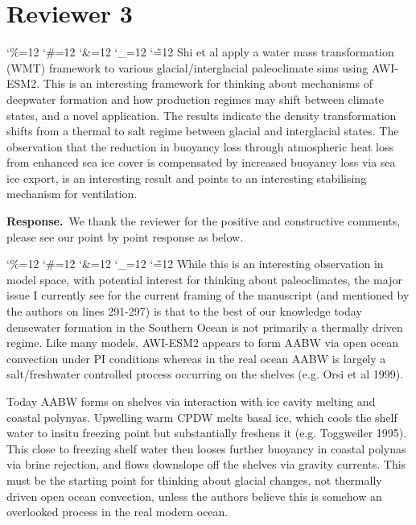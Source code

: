 \documentclass[11pt,a4paper]{article}
\newcommand{\reviewer}[1]{\section*{#1}}
\newcommand{\comment}[1]{\par\medskip\noindent\color{black}\begingroup\catcode`\%=12 \catcode`\#=12 \catcode`\&=12 \catcode`\_=12 \catcode`\~=12 \commentbody}
\newcommand{\commentbody}[1]{#1\endgroup\par\smallskip}
\newcommand{\response}{\par\noindent\color{chgcol}\textbf{Response.}\ }
\begin{document}


\reviewer{Reviewer 3}

\comment{R3}{Shi et al apply a water mass transformation (WMT) framework to various glacial/interglacial paleoclimate sims using AWI-ESM2. This is an interesting framework for thinking about mechanisms of deepwater formation and how production regimes may shift between climate states, and a novel application. The results indicate the density transformation shifts from a thermal to salt regime between glacial and interglacial states. The observation that the reduction in buoyancy loss through atmospheric heat loss from enhanced sea ice cover is compensated by increased buoyancy loss via sea ice export, is an interesting result and points to an interesting stabilising mechanism for ventilation.}

\response We thank the reviewer for the positive and constructive comments, please see our point by point response as below. 

\comment{R3}{While this is an interesting observation in model space, with potential interest for thinking about paleoclimates, the major issue I currently see for the current framing of the manuscript (and mentioned by the authors on lines 291-297) is that to the best of our knowledge today densewater formation in the Southern Ocean is not primarily a thermally driven regime. Like many models, AWI-ESM2 appears to form AABW via open ocean convection under PI conditions whereas in the real ocean AABW is largely a salt/freshwater controlled process occurring on the shelves (e.g. Orsi et al 1999).

Today AABW forms on shelves via interaction with ice cavity melting and coastal polynyas. Upwelling warm CPDW melts basal ice, which cools the shelf water to insitu freezing point but substantially freshens it (e.g. Toggweiler 1995). This close to freezing shelf water then looses further buoyancy in coastal polynas via brine rejection, and flows downslope off the shelves via gravity currents. This must be the starting point for thinking about glacial changes, not thermally driven open ocean convection, unless the authors believe this is somehow an overlooked process in the real modern ocean.}
\end{document}
